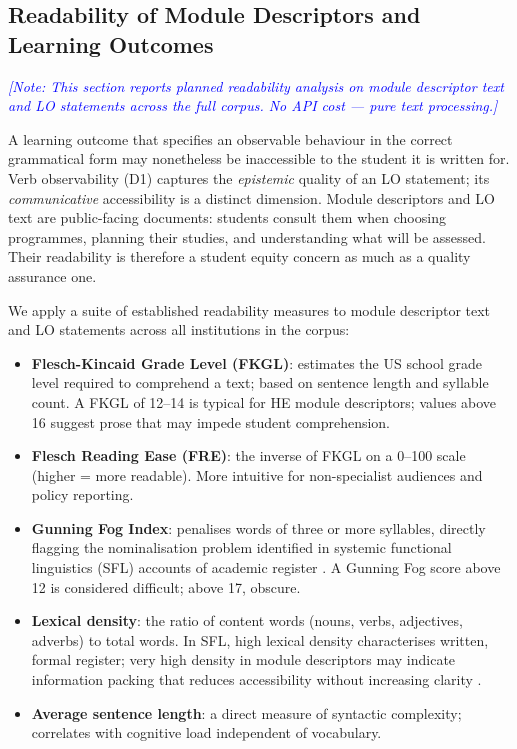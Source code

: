 \documentclass[12pt, a4paper]{article}
\newcommand{\note}[1]{\textcolor{blue}{\textit{[Note: #1]}}}
\begin{document}
\subsection{Readability of Module Descriptors and Learning Outcomes}
\label{sec:readability}

\note{This section reports planned readability analysis on module descriptor text and
LO statements across the full corpus. No API cost — pure text processing.}

A learning outcome that specifies an observable behaviour in the correct grammatical
form may nonetheless be inaccessible to the student it is written for. Verb
observability (D1) captures the \emph{epistemic} quality of an LO statement; its
\emph{communicative} accessibility is a distinct dimension. Module descriptors and
LO text are public-facing documents: students consult them when choosing programmes,
planning their studies, and understanding what will be assessed. Their readability
is therefore a student equity concern as much as a quality assurance one.

We apply a suite of established readability measures to module descriptor text and
LO statements across all institutions in the corpus:

\begin{itemize}
  \item \textbf{Flesch-Kincaid Grade Level (FKGL)}: estimates the US school grade
    level required to comprehend a text; based on sentence length and syllable count.
    A FKGL of 12--14 is typical for HE module descriptors; values above 16 suggest
    prose that may impede student comprehension.

  \item \textbf{Flesch Reading Ease (FRE)}: the inverse of FKGL on a 0--100 scale
    (higher = more readable). More intuitive for non-specialist audiences and
    policy reporting.

  \item \textbf{Gunning Fog Index}: penalises words of three or more syllables,
    directly flagging the nominalisation problem identified in systemic functional
    linguistics (SFL) accounts of academic register
    \citep{halliday1993language}. A Gunning Fog score above 12 is considered
    difficult; above 17, obscure.

  \item \textbf{Lexical density}: the ratio of content words (nouns, verbs,
    adjectives, adverbs) to total words. In SFL, high lexical density characterises
    written, formal register; very high density in module descriptors may indicate
    information packing that reduces accessibility without increasing clarity
    \citep{halliday1989spoken}.

  \item \textbf{Average sentence length}: a direct measure of syntactic complexity;
    correlates with cognitive load independent of vocabulary.
\end{itemize}
\end{document}
